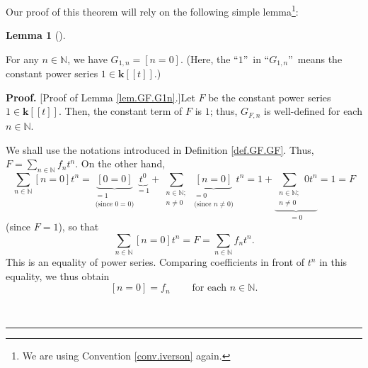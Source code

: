 \documentclass[numbers=enddot,12pt,final,onecolumn,notitlepage]{scrartcl}%
\theoremstyle{definition}
\newtheorem{lem}[theo]{Lemma}
\newenvironment{lemma}[1][]
{\begin{lem}[#1]\begin{leftbar}}
{\end{leftbar}\end{lem}}
\newenvironment{proof}[1][Proof]{\noindent\textbf{#1.} }{\ \rule{0.5em}{0.5em}}
\let\sumnonlimits\sum
\renewcommand{\sum}{\sumnonlimits\limits}
\newenvironment{verlong}{}{}
\begin{document}
\begin{verlong}
Our proof of this theorem will rely on the following simple lemma\footnote{We
are using Convention \ref{conv.iverson} again.}:

\begin{lemma}
\label{lem.GF.G1n}For any $n\in\mathbb{N}$, we have $G_{1,n}=\left[
n=0\right]  $. (Here, the \textquotedblleft$1$\textquotedblright\ in
\textquotedblleft$G_{1,n}$\textquotedblright\ means the constant power series
$1\in\mathbf{k}\left[  \left[  t\right]  \right]  $.)
\end{lemma}

\begin{proof}
[Proof of Lemma \ref{lem.GF.G1n}.]Let $F$ be the constant power series
$1\in\mathbf{k}\left[  \left[  t\right]  \right]  $. Then, the constant term
of $F$ is $1$; thus, $G_{F,n}$ is well-defined for each $n\in\mathbb{N}$.

We shall use the notations introduced in Definition \ref{def.GF.GF}. Thus,
$F=\sum_{n\in\mathbb{N}}f_{n}t^{n}$. On the other hand,%
\[
\sum_{n\in\mathbb{N}}\left[  n=0\right]  t^{n}=\underbrace{\left[  0=0\right]
}_{\substack{=1\\\text{(since }0=0\text{)}}}\underbrace{t^{0}}_{=1}%
+\sum_{\substack{n\in\mathbb{N};\\n\neq0}}\underbrace{\left[  n=0\right]
}_{\substack{=0\\\text{(since }n\neq0\text{)}}}t^{n}=1+\underbrace{\sum
_{\substack{n\in\mathbb{N};\\n\neq0}}0t^{n}}_{=0}=1=F
\]
(since $F=1$), so that%
\[
\sum_{n\in\mathbb{N}}\left[  n=0\right]  t^{n}=F=\sum_{n\in\mathbb{N}}%
f_{n}t^{n}.
\]
This is an equality of power series. Comparing coefficients in front of
$t^{n}$ in this equality, we thus obtain%
\begin{equation}
\left[  n=0\right]  =f_{n}\ \ \ \ \ \ \ \ \ \ \text{for each }n\in
\mathbb{N}\text{.} \label{pf.lem.GF.G1n.1}%
\end{equation}



\end{proof}
\end{verlong}
\end{document}
